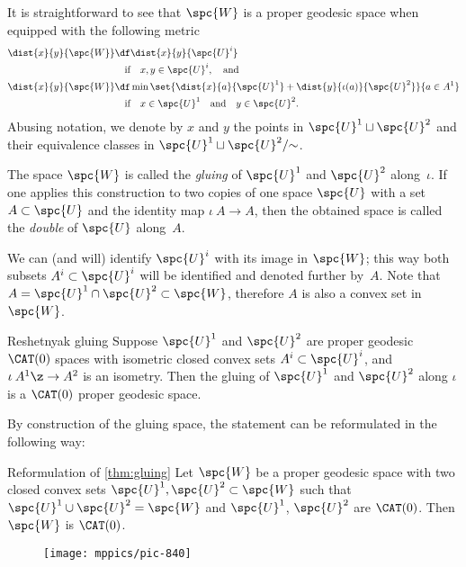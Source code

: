 It is straightforward to see that $\spc{W}$ is a proper geodesic space when equipped with the following metric
\begin{align*}
\dist{x}{y}{\spc{W}}&\df\dist{x}{y}{\spc{U}^i}
\\
&\quad\text{if}\quad x,y\in \spc{U}^i,\quad\text{and}
\\
\dist{x}{y}{\spc{W}}&\df\min\set{\dist{x}{a}{\spc{U}^1}+\dist{y}{\iota(a)}{\spc{U}^2}}{a\in A^1}
\\
&\quad\text{if}\quad x\in \spc{U}^1\quad\text{and}\quad y\in \spc{U}^2.
\end{align*}
Abusing notation, we denote by $x$ and $y$ the points in $\spc{U}^1\sqcup\spc{U}^2$ and their equivalence classes in $\spc{U}^1\sqcup\spc{U}^2/{{\sim}}$.

The  space $\spc{W}$ is called the \emph{gluing} of $\spc{U}^1$ and  $\spc{U}^2$ along~$\iota$.
If one applies this construction to two copies of one space $\spc{U}$ with a set $A\subset \spc{U}$ and the identity map $\iota\:A\to A$, then the obtained space is called the \emph{double} of $\spc{U}$ along~$A$.

We can (and will) identify $\spc{U}^i$ with its image in $\spc{W}$;
this way both subsets $A^i\subset \spc{U}^i$ will be identified and denoted further by~$A$.
Note that $A=\spc{U}^1\cap \spc{U}^2\subset \spc{W}$,
therefore $A$ is also a convex set in~$\spc{W}$.

{\sloppy

\begin{thm}{Reshetnyak gluing}\label{thm:gluing}
Suppose 
$\spc{U}^1$ and $\spc{U}^2$ are proper geodesic $\CAT(0)$ spaces 
with isometric 
closed 
 convex
sets $A^i\subset\spc{U}^i$, and $\iota\:A^1\z\to A^2$ is an isometry.
Then the gluing of $\spc{U}^1$ and  $\spc{U}^2$ along $\iota$ is a $\CAT(0)$ proper geodesic space.
\end{thm}

}

By construction of the gluing space, the statement can be reformulated in the following way:


\begin{thm}{Reformulation of \ref{thm:gluing}}
Let $\spc{W}$ be a 
proper geodesic space with two closed 
convex sets $\spc{U}^1,\spc{U}^2\subset\spc{W}$ such that 
$\spc{U}^1\cup\spc{U}^2=\spc{W}$
and $\spc{U}^1$, $\spc{U}^2$ are $\CAT(0)$.
Then $\spc{W}$ is $\CAT(0)$.
\end{thm}

\begin{wrapfigure}{o}{45mm}
\vskip-2mm
\centering
\texttt{[image: mppics/pic-840]}
\end{wrapfigure}

